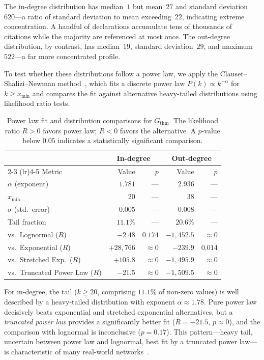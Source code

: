 The in-degree distribution has median~$1$ but mean~$27$ and standard deviation~$620$---a ratio of standard deviation to mean exceeding~$22$, indicating extreme concentration. A handful of declarations accumulate tens of thousands of citations while the majority are referenced at most once. The out-degree distribution, by contrast, has median~$19$, standard deviation~$29$, and maximum~$522$---a far more concentrated profile.

To test whether these distributions follow a power law, we apply the Clauset--Shalizi--Newman method~\cite{clauset2009}, which fits a discrete power law $P(k) \propto k^{-\alpha}$ for $k \ge x_{\min}$ and compares the fit against alternative heavy-tailed distributions using likelihood ratio tests.

\begin{table}[ht]
\centering
\caption{Power law fit and distribution comparisons for $G_{\mathrm{thm}}$. The likelihood ratio $R > 0$ favors power law; $R < 0$ favors the alternative. A $p$-value below $0.05$ indicates a statistically significant comparison.}
\label{tab:thm-powerlaw}
\begin{tabular}{lrrrr}
\toprule
& \multicolumn{2}{c}{In-degree} & \multicolumn{2}{c}{Out-degree} \\
\cmidrule(lr){2-3} \cmidrule(lr){4-5}
Metric & Value & $p$ & Value & $p$ \\
\midrule
$\alpha$ (exponent)     & $1.781$ & --- & $2.936$ & --- \\
$x_{\min}$              & $20$    & --- & $38$    & --- \\
$\sigma$ (std.\ error)  & $0.005$ & --- & $0.008$ & --- \\
Tail fraction           & $11.1\%$ & --- & $20.6\%$ & --- \\
\midrule
vs.\ Lognormal ($R$)          & $-2.48$   & $0.174$   & $-1{,}452.5$ & $\approx 0$ \\
vs.\ Exponential ($R$)        & $+28{,}766$ & $\approx 0$ & $-239.9$ & $0.014$ \\
vs.\ Stretched Exp.\ ($R$)    & $+105.8$  & $\approx 0$ & $-1{,}495.9$ & $\approx 0$ \\
vs.\ Truncated Power Law ($R$) & $-21.5$  & $\approx 0$ & $-1{,}509.5$ & $\approx 0$ \\
\bottomrule
\end{tabular}
\end{table}

For in-degree, the tail ($k \ge 20$, comprising $11.1\%$ of non-zero values) is well described by a heavy-tailed distribution with exponent $\alpha \approx 1.78$. Pure power law decisively beats exponential and stretched exponential alternatives, but a \emph{truncated power law} provides a significantly better fit ($R = -21.5$, $p \approx 0$), and the comparison with lognormal is inconclusive ($p = 0.17$). This pattern---heavy tail, uncertain between power law and lognormal, best fit by a truncated power law---is characteristic of many real-world networks~\cite{clauset2009}.


